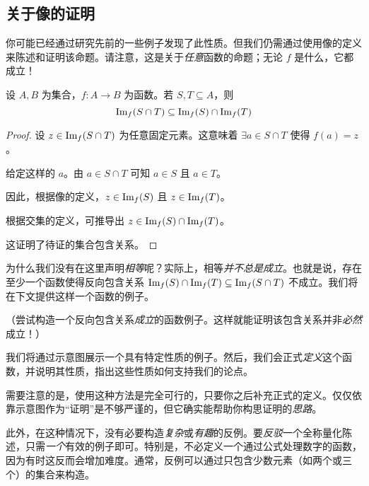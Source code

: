 
\subsection{关于像的证明}

你可能已经通过研究先前的一些例子发现了此性质。但我们仍需通过使用像的定义来陈述和证明该命题。请注意，这是关于\emph{任意}函数的命题；无论 $f$ 是什么，它都成立！

\begin{proposition}\label{prop:proposition7.3.6}
    设 $A, B$ 为集合，$f:A \to B$ 为函数。若 $S, T \subseteq A$，则
    \[\text{Im}_f (S \cap T) \subseteq \text{Im}_f (S) \cap \text{Im}_f (T)\]
\end{proposition}

\begin{proof}
    设 $z \in \text{Im}_f (S \cap T)$ 为任意固定元素。这意味着 $\exists a \in S \cap T$ 使得 $f(a) = z$。
    
    给定这样的 $a$。由 $a \in S \cap T$ 可知 $a \in S$ 且 $a \in T$。

    因此，根据像的定义，$z \in \text{Im}_f (S)$ 且 $z \in \text{Im}_f (T)$。

    根据交集的定义，可推导出 $z \in \text{Im}_f (S) \cap \text{Im}_f (T)$。

    这证明了待证的集合包含关系。
\end{proof}

为什么我们没有在这里声明\emph{相等}呢？实际上，相等\emph{并不总是成立}。也就是说，存在至少一个函数使得反向包含关系 $\text{Im}_f(S) \cap \text{Im}_f(T) \subseteq \text{Im}_f(S \cap T)$ 不成立。我们将在下文提供这样一个函数的例子。

（尝试构造一个反向包含关系\emph{成立}的函数例子。这样就能证明该包含关系并非\emph{必然}成立！）

我们将通过示意图展示一个具有特定性质的例子。然后，我们会正式\emph{定义}这个函数，并说明其性质，指出这些性质如何支持我们的论点。

需要注意的是，使用这种方法是完全可行的，只要你之后补充正式的定义。仅仅依靠示意图作为``证明''是不够严谨的，但它确实能帮助你构思证明的\emph{思路}。

此外，在这种情况下，没有必要构造\emph{复杂}或\emph{有趣}的反例。要\emph{反驳}一个全称量化陈述，只需\emph{一个}有效的例子即可。特别是，不必定义一个通过公式处理数字的函数，因为有时这反而会增加难度。通常，反例可以通过只包含少数元素（如两个或三个）的集合来构造。\\

